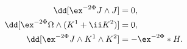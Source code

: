 \begin{equation}
\begin{aligned}
   \dd [\ex^{-2\Phi}J\wedge J] &= 0 , \\ 
   \dd [\ex^{-2\Phi}\Omega \wedge (K^1+\ii K^2)] &= 0 , \\
   \dd [\ex^{-2\Phi}J\wedge K^1 \wedge K^2] &= - \ex^{-2\Phi} * H . \\ 
\end{aligned}
\end{equation}

